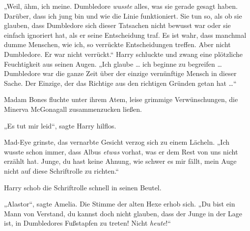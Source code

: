 „Weil, ähm, ich meine. Dumbledore \emph{wusste} alles, was sie gerade gesagt haben. Darüber, dass ich jung bin und wie die Linie funktioniert. Sie tun so, als ob sie glauben, dass Dumbledore sich dieser Tatsachen nicht bewusst war oder sie einfach ignoriert hat, als er seine Entscheidung traf. Es ist wahr, dass manchmal dumme Menschen, wie ich, so verrückte Entscheidungen treffen. Aber nicht Dumbledore. Er war nicht verrückt.“
Harry schluckte und zwang eine plötzliche Feuchtigkeit aus seinen Augen.
„Ich glaube … ich beginne zu begreifen … Dumbledore war die ganze Zeit über der einzige vernünftige Mensch in dieser Sache. Der Einzige, der das Richtige aus den richtigen Gründen getan hat …“

Madam Bones fluchte unter ihrem Atem, leise grimmige Verwünschungen, die Minerva McGonagall zusammenzucken ließen.

„Es tut mir leid“, sagte Harry hilflos.

Mad-Eye grinste, das vernarbte Gesicht verzog sich zu einem Lächeln.
„Ich wusste schon immer, dass Albus \emph{etwas} vorhat, was er dem Rest von uns nicht erzählt hat. Junge, du hast keine Ahnung, wie schwer es mir fällt, mein Auge nicht auf diese Schriftrolle zu richten.“

Harry schob die Schriftrolle schnell in seinen Beutel.

„Alastor“, sagte Amelia. Die Stimme der alten Hexe erhob sich.
„Du bist ein Mann von Verstand, du kannst doch nicht glauben, dass der Junge in der Lage ist, in Dumbledores Fußstapfen zu treten! Nicht \emph{heute}!“

